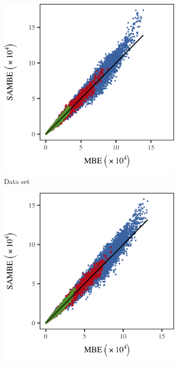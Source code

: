 		\begin{figure}
			\centering
			\begin{subfigure}{0.3\textwidth}
				\centering
				\includegraphics[keepaspectratio=true, width=\textwidth, height=0.23\textheight]{discussion/img/ferdosi_2_60000_mbe_sambe.png}
				\caption{Data set \ferdosiTwo}
				\label{fig:discussion:performance:mbevssambe:ferdosi2}
			\end{subfigure}
			\begin{subfigure}{0.3\textwidth}
				\centering
				\includegraphics[keepaspectratio=true, width=\textwidth, height=0.23\textheight]{discussion/img/baakman_2_60000_mbe_sambe.png}

\end{subfigure}
\end{figure}
